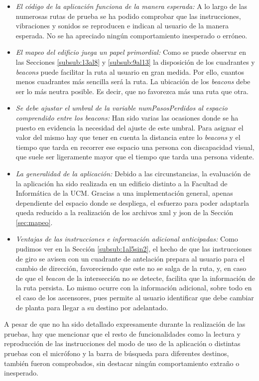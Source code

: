 \begin{itemize}
	\item \textit{El código de la aplicación funciona de la manera esperada:} A lo largo de las numerosas rutas de prueba se ha podido comprobar que las instrucciones, vibraciones y sonidos se reproducen e indican al usuario de la manera esperada. No se ha apreciado ningún comportamiento inesperado o erróneo. 
	
	\item \textit{El mapeo del edificio juega un papel primordial:} Como se puede observar en las Secciones \ref{subsub:13al8} y \ref{subsub:9al13} la disposición de los cuadrantes y \textit{beacons} puede facilitar la ruta al usuario en gran medida. Por ello, cuantos menos cuadrantes más sencilla será la ruta. La ubicación de los \textit{beacons} debe ser lo más neutra posible. Es decir, que no favorezca más una ruta que otra.
	
	\item  \textit{Se debe ajustar el umbral de la variable numPasosPerdidos al espacio comprendido entre los beacons:} Han sido varias las ocasiones donde se ha puesto en evidencia la necesidad del ajuste de este umbral. Para asignar el valor del mismo hay que tener en cuenta la distancia entre lo \textit{beacons} y el tiempo que tarda en recorrer ese espacio una persona con discapacidad visual, que suele ser ligeramente mayor que el tiempo que tarda una persona vidente.
	
	\item \textit{La generalidad de la aplicación:} Debido a las circunstancias, la evaluación de la aplicación ha sido realizada en un edificio distinto a la Facultad de Informática de la UCM. Gracias a una implementación general, apenas dependiente del espacio donde se despliega, el esfuerzo para poder adaptarla queda reducido a la realización de los archivos xml y json de la Sección \ref{sec:mapeo}.
	
	\item \textit{Ventajas de las instrucciones e información adicional anticipadas:} Como pudimos ver en la Sección \ref{subsub:1al5sin2}, el hecho de que las instrucciones de giro se avisen con un cuadrante de antelación prepara al usuario para el cambio de dirección, favoreciendo que este no se salga de la ruta, y, en caso de que el \textit{beacon} de la intersección no se detecte, facilita que la información de la ruta persista. Lo mismo ocurre con la información adicional, sobre todo en el caso de los ascensores, pues permite al usuario identificar que debe cambiar de planta para llegar a su destino por adelantado.

\end{itemize}

A pesar de que no ha sido detallado expresamente durante la realización de las pruebas, hay que mencionar que el resto de funcionalidades como la lectura y reproducción de las instrucciones del modo de uso de la aplicación o distintas pruebas con el micrófono y la barra de búsqueda para diferentes destinos, también fueron comprobados, sin destacar ningún comportamiento extraño o inesperado.


